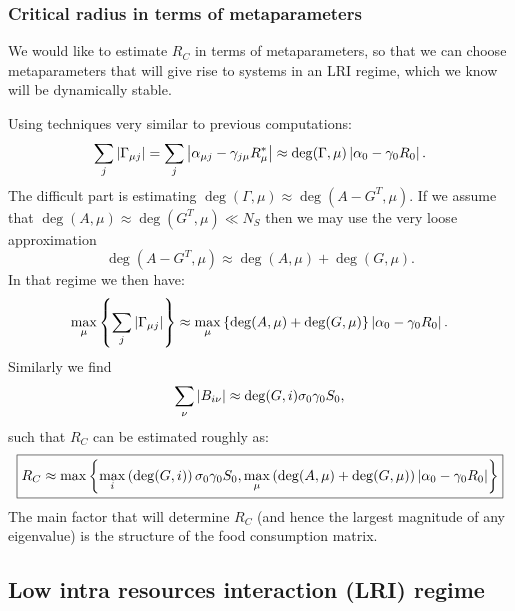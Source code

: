 \documentclass[12pt, titlepage]{report}
\begin{document}
\subsubsection{Critical radius in terms of metaparameters}
We would like to estimate $R_C$ in terms of metaparameters, so that we can choose metaparameters that will give rise to systems in an LRI regime, which we know will be dynamically stable.

Using techniques very similar to previous computations:
\begin{equation}
\sum_j \left|{\Gamma_{\mu j}}\right| = \sum_j \left|{\alpha_{\mu j}-\gamma_{j\mu}R^*_\mu}\right| \approx \deg(\Gamma, \mu)\left|{\alpha_0 - \gamma_0 R_0}\right|.
\end{equation}
The difficult part is estimating $\deg(\Gamma, \mu) \approx \deg(A-G^T, \mu)$. If we assume that $\deg(A, \mu)\approx \deg(G^T, \mu) \ll N_S$ then we may use the very loose approximation
\begin{equation}
\deg(A-G^T, \mu) \approx \deg(A, \mu)+\deg(G, \mu).
\end{equation}
In that regime we then have:
\begin{equation}
\max_\mu\left\{\sum_j \left|{\Gamma_{\mu j}}\right|\right\} \approx \max_\mu\left\{\deg(A, \mu)+\deg(G, \mu)\right\} \left|{\alpha_0-\gamma_0 R_0}\right|.
\end{equation}
Similarly we find
\begin{equation}
\sum_\nu \left|{B_{i\nu}}\right| \approx \deg(G, i) \sigma_0 \gamma_0 S_0,
\end{equation}
such that $R_C$ can be estimated roughly as:
\begin{equation}\boxed{
R_C \approx \max\left\{ \max_i\left(\deg(G,i)\right) \sigma_0 \gamma_0 S_0, \max_\mu\left(\deg(A,\mu)+\deg(G,\mu)\right)\left|{\alpha_0-\gamma_0 R_0}\right|\right\}
}\label{eq: estimate R_C metaparameters}
\end{equation}
The main factor that will determine $R_C$ (and hence the largest magnitude of any eigenvalue) is the structure of the food consumption matrix.


\subsection{Low intra resources interaction (LRI) regime }
\end{document}
